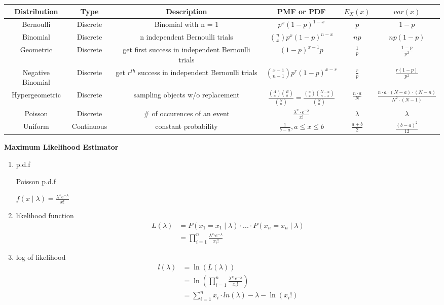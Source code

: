 \documentclass{article}
\begin{document}
\begin{small}
\center\begin{tabular}{ |c|c|c|c|c|c| }
\hline 
Distribution & Type & Description & PMF or PDF & $E_X(x)$ & $var(x)$ \\
\hline
Bernoulli & Discrete & Binomial with n = 1 & $ p^{x}(1-p)^{1-x}$ & $p$ & $1 - p$ \\
\hline
Binomial & Discrete & n independent Bernoulli trials & $\binom{n}{x}p^{x}(1-p)^{n-x}$ & $np$ & $np(1 - p)$ \\
\hline
Geometric & Discrete & get first success in independent Bernoulli trials & $(1 - p)^{x - 1}p$ & $\frac{1}{p}$ & $\frac{1 - p}{p^2}$ \\
\hline
Negative Binomial & Discrete & get $r^{th}$ success in independent Bernoulli trials & $\binom{x - 1}{n - 1}p^{r}(1 - p)^{x - r}$ & $\frac{r}{p}$ & $\frac{r(1 - p)}{p^2}$ \\
\hline
Hypergeometric & Discrete & sampling objects w/o replacement & $\frac{\binom{A}{a}\binom{B}{b}}{\binom{N}{n}} = \frac{\binom{a}{x}\binom{N-a}{n-x}}{\binom{N}{n}}$ & $\frac{n \cdot a}{N}$ & $\frac{n \cdot a \cdot (N - a) \cdot (N - n)}{N^2 \cdot (N - 1)}$\\
\hline
Poisson & Discrete & \# of occurences of an event & $\frac{\lambda^x \cdot e^{-\lambda}}{x!}$ & $\lambda$ & $\lambda$\\
\hline
\hline
Uniform & Continuous & constant probability & $\frac{1}{b - a}, a \le x \le b$ & $\frac{a + b}{2}$ & $\frac{(b-a)^2}{12}$\\
\hline
\end{tabular}

\begin{multicols}{2}
\textbf{Maximum Likelihood Estimator}

\begin{enumerate}
\item p.d.f

Poisson p.d.f

$f(x \mid \lambda) = \frac{\lambda^x e^{-\lambda}}{x!}$

\item likelihood function 
\begin{align*}
L(\lambda) & = P(x_1 = x_1 \mid \lambda) \cdot ... \cdot P(x_n = x_n \mid \lambda) \\
           & =  \prod_{i = 1}^{n} \frac{\lambda^{x_i}e^{-\lambda}}{x_i!}
\end{align*}

\item log of likelihood
\begin{align*}
l(\lambda) & = \ln(L(\lambda)) \\
           & = \ln(\prod_{i = 1}^{n} \frac{\lambda^{x_i}e^{-\lambda}}{x_i!}) \\
           & = \sum_{i = 1}^{n} x_i \cdot ln(\lambda) - \lambda - \ln(x_i!)
\end{align*}


\end{enumerate}
\end{multicols}
\end{small}
\end{document}
